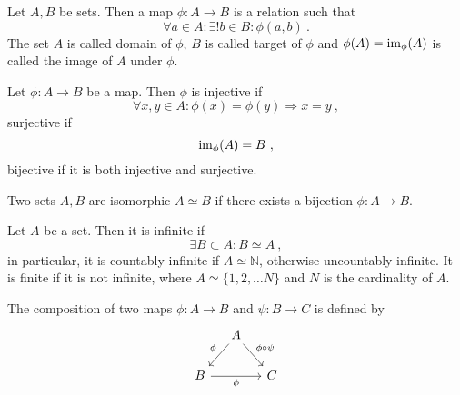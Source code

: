     \begin{definition}
        Let $A, B$ be sets. Then a map $\phi\colon A \rightarrow B$ is a relation such that
        \begin{equation*}
            \forall a \in A \colon \exists! b \in B \colon \phi(a,b)~.
        \end{equation*}
        The set $A$ is called domain of $\phi$, $B$ is called target of $\phi$ and $\phi(A) = \operatorname{im}_\phi (A)$ is called the image of $A$ under $\phi$.
    \end{definition}

    \begin{definition}
        Let $\phi \colon A \rightarrow B$ be a map. Then $\phi$ is injective if 
        \begin{equation*}
            \forall x, y \in A \colon \phi(x) = \phi(y) \Rightarrow x = y ~,
        \end{equation*}
        surjective if 
        \begin{equation*}
            \operatorname{im}_\phi (A) = B ~,
        \end{equation*}
        bijective if it is both injective and surjective.
    \end{definition}

    \begin{definition}
        Two sets $A, B$ are isomorphic $A \simeq B$ if there exists a bijection $\phi \colon A \rightarrow B$.
    \end{definition}

    \begin{definition}
        Let $A$ be a set. Then it is infinite if 
        \begin{equation*}
            \exists B \subset A \colon B \simeq A ~,
        \end{equation*}
        in particular, it is countably infinite if $A \simeq \mathbb N$, otherwise uncountably infinite. It is finite if it is not infinite, where $A \simeq \{1, 2, \ldots N\}$ and $N$ is the cardinality of $A$.
    \end{definition}

    \begin{definition}
        The composition of two maps $\phi\colon A \rightarrow B$ and $\psi \colon B \rightarrow C$ is defined by
        \begin{equation*}
            \begin{tikzcd}[column sep=small]
                & A \arrow{dl}[swap]{\phi} \arrow[dr, "\phi \circ \psi"] & \\
                B \arrow{rr}[swap]{\phi} & & C
            \end{tikzcd}
        \end{equation*}
    \end{definition}

